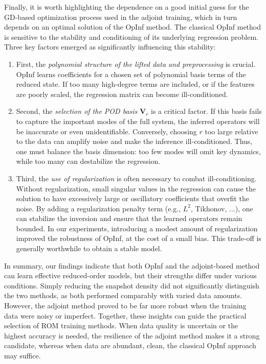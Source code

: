Finally, it is worth highlighting the dependence on a good initial guess for the GD-based optimization process used in the adjoint training, which in turn depends on an optimal solution of the OpInf method. The classical OpInf method is sensitive to the stability and conditioning of its underlying regression problem. Three key factors emerged as significantly influencing this stability:
\begin{enumerate}[label=(\roman*)]
  \item First, the {\it polynomial structure of the lifted data and preprocessing} is crucial. OpInf learns coefficients for a chosen set of polynomial basis terms of the reduced state. If too many high-degree terms are included, or if the features are poorly scaled, the regression matrix can become ill-conditioned.
  \item Second, the {\it selection of the POD basis} $\mathbf{V}_r$ is a critical factor. If this basis fails to capture the important modes of the full system, the inferred operators will be inaccurate or even unidentifiable. Conversely, choosing $r$ too large relative to the data can amplify noise and make the inference ill-conditioned. Thus, one must balance the basis dimension: too few modes will omit key dynamics, while too many can destabilize the regression. 
  \item Third, the {\it use of regularization} is often necessary to combat ill-conditioning. Without regularization, small singular values in the regression can cause the solution to have excessively large or oscillatory coefficients that overfit the noise. By adding a regularization penalty term (e.g., $L^2$, Tikhonov, ...), one can stabilize the inversion and ensure that the learned operators remain bounded. In our experiments, introducing a modest amount of regularization improved the robustness of OpInf, at the cost of a small bias. This trade-off is generally worthwhile to obtain a stable model.
\end{enumerate}


In summary, our findings indicate that both OpInf and the adjoint-based method can learn effective reduced-order models, but their strengths differ under various conditions. Simply reducing the snapshot density did not significantly distinguish the two methods, as both performed comparably with varied data amounts. However, the adjoint method proved to be far more robust when the training data were noisy or imperfect. Together, these insights can guide the practical selection of ROM training methods. When data quality is uncertain or the highest accuracy is needed, the resilience of the adjoint method makes it a strong candidate, whereas when data are abundant, clean, the classical OpInf approach may suffice. 

